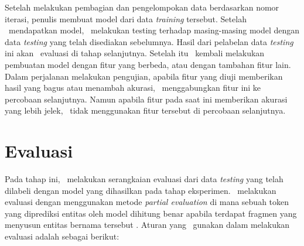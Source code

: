 Setelah melakukan pembagian dan pengelompokan data berdasarkan nomor iterasi, penulis membuat model dari data \textit{training} tersebut. Setelah \saya~mendapatkan model, \saya~melakukan testing terhadap masing-masing model dengan data \textit{testing} yang telah disediakan sebelumnya. Hasil dari pelabelan data \textit{testing} ini akan \saya~evaluasi di tahap selanjutnya. Setelah itu \saya~kembali melakukan pembuatan model dengan fitur yang berbeda, atau dengan tambahan fitur lain. Dalam perjalanan melakukan pengujian, apabila fitur yang diuji memberikan hasil yang bagus atau menambah akurasi, \saya~menggabungkan fitur ini ke percobaan selanjutnya. Namun apabila fitur pada saat ini memberikan akurasi yang lebih jelek, \saya~tidak menggunakan fitur tersebut di percobaan selanjutnya.

\section{Evaluasi}
Pada tahap ini, \saya~melakukan serangkaian evaluasi dari data \textit{testing} yang telah dilabeli dengan model yang dihasilkan pada tahap eksperimen. \Saya~melakukan evaluasi dengan menggunakan metode \textit{partial evaluation} di mana sebuah token yang diprediksi entitas oleh model dihitung benar apabila terdapat fragmen yang menyusun entitas bernama tersebut \citep{seki2003probabilistic}. Aturan yang \saya~gunakan dalam melakukan evaluasi adalah sebagai berikut: 

